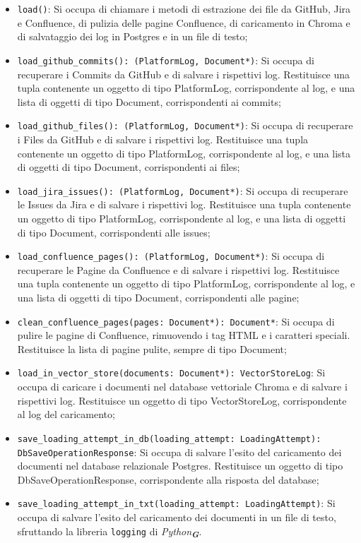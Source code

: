 \begin{itemize}
    \item \texttt{load()}: Si occupa di chiamare i metodi di estrazione dei file da GitHub, Jira e Confluence, di pulizia delle pagine Confluence, di caricamento in Chroma e di salvataggio dei log in Postgres e in un file di testo;
    \item \texttt{load\_github\_commits(): (PlatformLog, Document*)}: Si occupa di recuperare i Commits da GitHub e di salvare i rispettivi log. Restituisce una tupla contenente un oggetto di tipo PlatformLog, corrispondente al log, e una lista di oggetti di tipo Document, corrispondenti ai commits;
    \item \texttt{load\_github\_files(): (PlatformLog, Document*)}: Si occupa di recuperare i Files da GitHub e di salvare i rispettivi log. Restituisce una tupla contenente un oggetto di tipo PlatformLog, corrispondente al log, e una lista di oggetti di tipo Document, corrispondenti ai files;
    \item \texttt{load\_jira\_issues(): (PlatformLog, Document*)}: Si occupa di recuperare le Issues da Jira e di salvare i rispettivi log. Restituisce una tupla contenente un oggetto di tipo PlatformLog, corrispondente al log, e una lista di oggetti di tipo Document, corrispondenti alle issues;
    \item \texttt{load\_confluence\_pages(): (PlatformLog, Document*)}: Si occupa di recuperare le Pagine da Confluence e di salvare i rispettivi log. Restituisce una tupla contenente un oggetto di tipo PlatformLog, corrispondente al log, e una lista di oggetti di tipo Document, corrispondenti alle pagine;
    \item \texttt{clean\_confluence\_pages(pages: Document*): Document*}: Si occupa di pulire le pagine di Confluence, rimuovendo i tag HTML e i caratteri speciali. Restituisce la lista di pagine pulite, sempre di tipo Document;
    \item \texttt{load\_in\_vector\_store(documents: Document*): VectorStoreLog}: Si occupa di caricare i documenti nel database vettoriale Chroma e di salvare i rispettivi log. Restituisce un oggetto di tipo VectorStoreLog, corrispondente al log del caricamento;
    \item \texttt{save\_loading\_attempt\_in\_db(loading\_attempt: LoadingAttempt):\\ DbSaveOperationResponse}: Si occupa di salvare l'esito del caricamento dei documenti nel database relazionale Postgres. Restituisce un oggetto di tipo DbSaveOperationResponse, corrispondente alla risposta del database;
    \item \texttt{save\_loading\_attempt\_in\_txt(loading\_attempt: LoadingAttempt)}: Si occupa di salvare l'esito del caricamento dei documenti in un file di testo, sfruttando la libreria \texttt{logging} di \emph{Python}\textsubscript{\textbf{\textit{G}}}.
\end{itemize}

